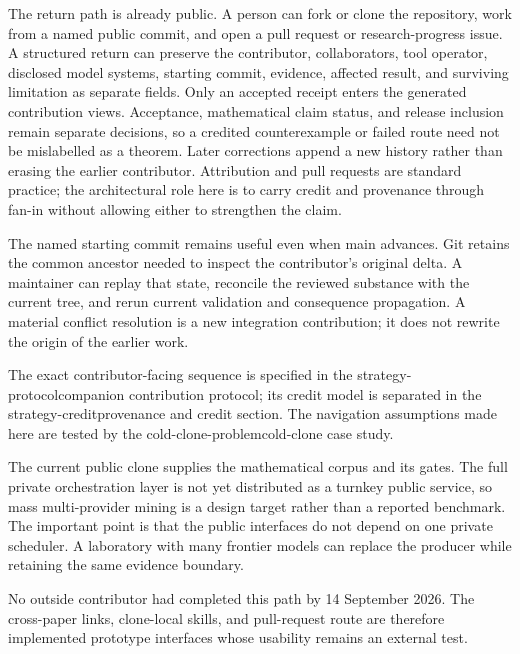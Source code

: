\documentclass[10pt]{article}
\begin{document}
The return path is already public. A person can fork or clone the repository,
work from a named public commit, and open a pull request or research-progress
issue. A structured return can preserve the contributor, collaborators, tool
operator, disclosed model systems, starting commit, evidence, affected result,
and surviving limitation as separate fields. Only an accepted receipt enters
the generated contribution views. Acceptance, mathematical claim status, and
release inclusion remain separate decisions, so a credited counterexample or
failed route need not be mislabelled as a theorem. Later corrections append a
new history rather than erasing the earlier contributor. Attribution and pull
requests are standard practice; the architectural role here is to carry credit
and provenance through fan-in without allowing either to strengthen the claim.

The named starting commit remains useful even when main advances. Git retains
the common ancestor needed to inspect the contributor's original delta. A
maintainer can replay that state, reconcile the reviewed substance with the
current tree, and rerun current validation and consequence propagation. A
material conflict resolution is a new integration contribution; it does not
rewrite the origin of the earlier work.

The exact contributor-facing sequence is specified in the
%
{strategy-protocol}{companion contribution protocol}; its credit model is
separated in the
%
{strategy-credit}{provenance and credit section}. The navigation assumptions
made here are tested by the
%
{cold-clone-problem}{cold-clone case study}.

The current public clone supplies the mathematical corpus and its gates. The
full private orchestration layer is not yet distributed as a turnkey public
service, so mass multi-provider mining is a design target rather than a
reported benchmark. The important point is that the public interfaces do not
depend on one private scheduler. A laboratory with many frontier models can
replace the producer while retaining the same evidence boundary.

No outside contributor had completed this path by 14 September 2026. The
cross-paper links, clone-local skills, and pull-request route are therefore
implemented prototype interfaces whose usability remains an external test.
\end{document}

